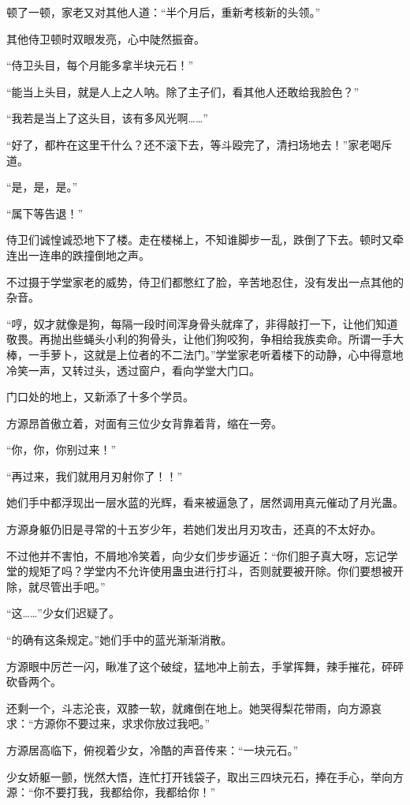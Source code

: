 \begin{this_body}
顿了一顿，家老又对其他人道：“半个月后，重新考核新的头领。”

其他侍卫顿时双眼发亮，心中陡然振奋。

“侍卫头目，每个月能多拿半块元石！”

“能当上头目，就是人上之人呐。除了主子们，看其他人还敢给我脸色？”

“我若是当上了这头目，该有多风光啊……”

“好了，都杵在这里干什么？还不滚下去，等斗殴完了，清扫场地去！”家老喝斥道。

“是，是，是。”

“属下等告退！”

侍卫们诚惶诚恐地下了楼。走在楼梯上，不知谁脚步一乱，跌倒了下去。顿时又牵连出一连串的跌撞倒地之声。

不过摄于学堂家老的威势，侍卫们都憋红了脸，辛苦地忍住，没有发出一点其他的杂音。

“哼，奴才就像是狗，每隔一段时间浑身骨头就痒了，非得敲打一下，让他们知道敬畏。再抛出些蝇头小利的狗骨头，让他们狗咬狗，争相给我族卖命。所谓一手大棒，一手萝卜，这就是上位者的不二法门。”学堂家老听着楼下的动静，心中得意地冷笑一声，又转过头，透过窗户，看向学堂大门口。

门口处的地上，又新添了十多个学员。

方源昂首傲立着，对面有三位少女背靠着背，缩在一旁。

“你，你，你别过来！”

“再过来，我们就用月刃射你了！！”

她们手中都浮现出一层水蓝的光辉，看来被逼急了，居然调用真元催动了月光蛊。

方源身躯仍旧是寻常的十五岁少年，若她们发出月刃攻击，还真的不太好办。

不过他并不害怕，不屑地冷笑着，向少女们步步逼近：“你们胆子真大呀，忘记学堂的规矩了吗？学堂内不允许使用蛊虫进行打斗，否则就要被开除。你们要想被开除，就尽管出手吧。”

“这……”少女们迟疑了。

“的确有这条规定。”她们手中的蓝光渐渐消散。

方源眼中厉芒一闪，瞅准了这个破绽，猛地冲上前去，手掌挥舞，辣手摧花，砰砰砍昏两个。

还剩一个，斗志沦丧，双膝一软，就瘫倒在地上。她哭得梨花带雨，向方源哀求：“方源你不要过来，求求你放过我吧。”

方源居高临下，俯视着少女，冷酷的声音传来：“一块元石。”

少女娇躯一颤，恍然大悟，连忙打开钱袋子，取出三四块元石，捧在手心，举向方源：“你不要打我，我都给你，我都给你！”


\end{this_body}
